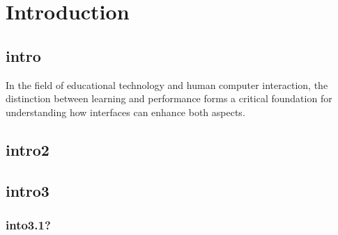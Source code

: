 \chapter{Introduction}

\section{intro}
In the field of educational technology and human computer interaction, the distinction between learning
and performance forms a critical foundation for understanding how interfaces can enhance both aspects.
\section{intro2}
\section{intro3}
\subsection{into3.1?}


\pagebreak
